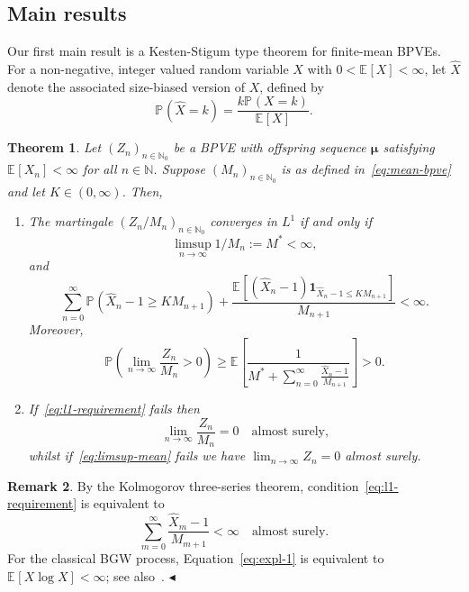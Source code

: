 \documentclass[12pt]{article}
\newtheorem{thm}{Theorem}[section]
\theoremstyle{definition}
\newtheorem{rmq}[thm]{Remark}
\newcommand{\E}[2][]{\ensuremath{\mathbb{E}_{#1}\left[#2 \right]}}
\newcommand{\Prob}[2][]{\ensuremath{\mathbb{P}_{#1} \left(#2 \right)}}
\newcommand{\ensymboldremark }{\hfill$\blacktriangleleft$}
\begin{document}
\subsection{Main results}
Our first main result is a Kesten-Stigum type theorem for finite-mean BPVEs. For a non-negative, integer valued random variable $X$ with $0 < \E{X} < \infty$, let $\widehat{X}$ denote the associated size-biased version of $X$, defined by
\begin{equation}
\Prob{\widehat{X} = k} = \frac{k \Prob{X = k}}{\E{X}}. 
\end{equation} 
\begin{thm} \label{thm:unif-integrable}
    Let $(Z_{n})_{n\in \mathbb{N}_0}$ be a BPVE with offspring sequence $\boldsymbol{\mu}$ satisfying $\E{X_{n}} < \infty$ for all $n \in \mathbb{N}$. Suppose $(M_{n})_{n \in \mathbb{N}_0}$ is as defined in~\eqref{eq:mean-bpve} and let $K \in (0,\infty)$. Then,  
     \begin{enumerate}
            \item \label{item:non-deg-limit} The martingale $(Z_{n}/M_{n})_{n \in \mathbb{N}_{0}}$ converges in $L^1$ if and only if 
            \begin{equation} \label{eq:limsup-mean}
            \limsup_{n \to \infty} 1/M_{n} := M^{*} < \infty,
            \end{equation}
            and
            \begin{equation} \label{eq:l1-requirement}
                \sum_{n=0}^{\infty} \Prob{\widehat{X}_{n} - 1\geq K M_{n+1}} + \frac{\E{\left(\widehat{X}_{n} - 1 \right)\mathbf{1}_{\widehat{X}_n - 1 \leq K M_{n+1}}}}{M_{n+1}} < \infty.  
            \end{equation}
            Moreover,  
            \begin{equation}
            \label{eq:prob-pos}
                \Prob{\lim_{n \to \infty} \frac{Z_{n}}{M_{n}} > 0} \geq \E{\frac{1}{M^{*} + \sum_{n=0}^{\infty} \frac{\widehat{X}_{n} - 1}{M_{n+1}}}} > 0.
            \end{equation}
            \item \label{item:deg-limit} If~\eqref{eq:l1-requirement} fails then
             \[\lim_{n \to \infty} \frac{Z_{n}}{M_n} = 0 \quad \text{almost surely,}\] whilst if~\eqref{eq:limsup-mean} fails we have $\lim_{n \to \infty} Z_n =0$ almost surely. 
        \end{enumerate}
\end{thm}

\begin{rmq}
    By the Kolmogorov three-series theorem, condition~\eqref{eq:l1-requirement} is equivalent to  
    \begin{equation} \label{eq:expl-1} \sum_{m=0}^{\infty} \frac{\widehat{X}_{m} - 1}{M_{m+1}} < \infty \quad \text{almost surely.}
    \end{equation}
    For the classical BGW process, Equation~\eqref{eq:expl-1} is equivalent to $\E{X \log{X}} < \infty$; see also~\cite{lyons-pemantle-peres}.   {\small\ensymboldremark }
\end{rmq}
\end{document}
